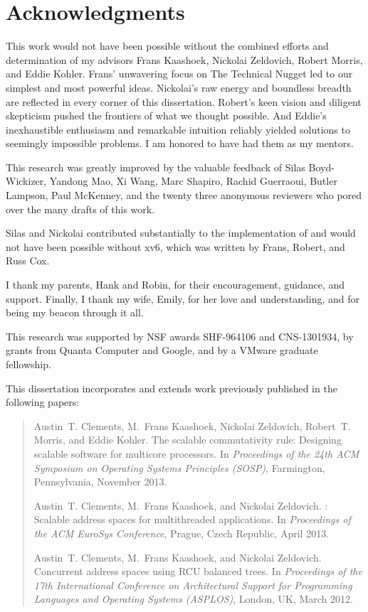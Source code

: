\chapter*{Acknowledgments}

This work would not have been possible without the combined efforts
and determination of my advisors Frans Kaashoek, Nickolai Zeldovich,
Robert Morris, and Eddie Kohler.
%
Frans' unwavering focus on The Technical Nugget led to our simplest
and most powerful ideas.
%
Nickolai's raw energy and boundless breadth are reflected in every
corner of this dissertation.
%
Robert's keen vision and diligent skepticism pushed the frontiers of
what we thought possible.
%
And Eddie's inexhaustible enthusiasm and remarkable intuition reliably
yielded solutions to seemingly impossible problems.
%
I am honored to have had them as my mentors. %

This research was greatly improved by the valuable feedback of Silas
Boyd-Wickizer, Yandong Mao, Xi Wang, Marc Shapiro, Rachid Guerraoui,
Butler Lampson, Paul McKenney, and the twenty three anonymous
reviewers who pored over the many drafts of this work.

Silas and Nickolai contributed substantially to the implementation of
\sys and \sys would not have been possible without xv6, which was
written by Frans, Robert, and Russ Cox.

I thank my parents, Hank and Robin, for their encouragement, guidance,
and support. %
%
Finally, I thank my wife, Emily, for her love and understanding, and
for being my beacon through it all.

\asterism

This research was supported by NSF awards SHF-964106 and CNS-1301934,
by grants from Quanta Computer and Google, and by a VMware graduate
fellowship.

\asterism

This dissertation incorporates and extends work previously published
in the following papers:

\begin{quote}
  Austin~T. Clements, M.~Frans Kaashoek, Nickolai Zeldovich,
  Robert~T. Morris, and Eddie Kohler.
  \newblock The scalable commutativity rule: Designing scalable
  software for multicore processors.
  \newblock In \emph{Proceedings of the 24th ACM Symposium on
    Operating Systems Principles (\mbox{SOSP})}, Farmington,
  Pennsylvania, November 2013.

  Austin~T. Clements, M.~Frans Kaashoek, and Nickolai Zeldovich.
  : Scalable address spaces for multithreaded
  applications.
  \newblock In \emph{Proceedings of the ACM EuroSys Conference},
  Prague, Czech Republic, April 2013.

  Austin~T. Clements, M.~Frans Kaashoek, and Nickolai Zeldovich.
  \newblock Concurrent address spaces using {RCU} balanced trees.
  \newblock In \emph{Proceedings of the 17th International Conference
    on Architectural Support for Programming Languages and Operating
    Systems (\mbox{ASPLOS})}, London, UK, March 2012.
\end{quote}
